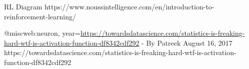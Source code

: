 RL Diagram https://www.noussintelligence.com/en/introduction-to-reinforcement-learning/

@misc{web:neuron, 
    year={\href{https://towardsdatascience.com/statistics-is-freaking-hard-wtf-is-activation-function-df8342cdf292/}{https://towardsdatascience.com/statistics-is-freaking-hard-wtf-is-activation-function-df8342cdf292} 
    - By Patreek August 16, 2017
    }
}
https://towardsdatascience.com/statistics-is-freaking-hard-wtf-is-activation-function-df8342cdf292
